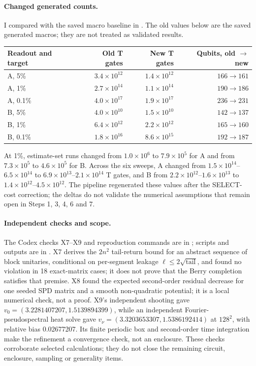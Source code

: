 \documentclass[11pt,a4paper]{article}
\begin{document}
\paragraph{Changed generated counts.}
I compared  with the saved macro baseline in
. The old values below are the saved generated macros; they are not treated as validated results.
\begin{center}\small
\begin{tabular}{@{}lrrr@{}}
\toprule
Readout and target & Old T gates & New T gates & Qubits, old $\to$ new\\
\midrule
A, 5\% & $3.4\times10^{12}$ & $1.4\times10^{12}$ & $166\to161$\\
A, 1\% & $2.7\times10^{14}$ & $1.1\times10^{14}$ & $190\to186$\\
A, 0.1\% & $4.0\times10^{17}$ & $1.9\times10^{17}$ & $236\to231$\\
B, 5\% & $4.0\times10^{10}$ & $1.5\times10^{10}$ & $142\to137$\\
B, 1\% & $6.4\times10^{12}$ & $2.2\times10^{12}$ & $165\to160$\\
B, 0.1\% & $1.8\times10^{16}$ & $8.6\times10^{15}$ & $192\to187$\\
\bottomrule
\end{tabular}
\end{center}
At 1\%, estimate-set runs changed from $1.0\times10^6$ to $7.9\times10^5$ for A and from $7.3\times10^5$ to
$4.6\times10^5$ for B. Across the six sweeps, A changed from $1.5\times10^{14}$--$6.5\times10^{14}$ to
$6.9\times10^{13}$--$2.1\times10^{14}$ T gates, and B from $2.2\times10^{12}$--$1.6\times10^{13}$ to
$1.4\times10^{12}$--$4.5\times10^{12}$. The pipeline regenerated these values after the SELECT-cost correction;
the deltas do not validate the numerical assumptions that remain open in Steps 1, 3, 4, 6 and 7.

\paragraph{Independent checks and scope.}
The Codex checks X7--X9 and reproduction commands are in ; scripts and outputs are in
. X7 derives the $2n^2$ tail-return bound for an abstract sequence of block unitaries, conditional on
per-segment leakage $\ell\le2\sqrt{\text{tail}}$, and found no violation in 18 exact-matrix cases; it does not prove that the
Berry completion satisfies that premise. X8 found the expected second-order residual decrease for one seeded SPD matrix and a
smooth non-quadratic potential; it is a local numerical check, not a proof. X9's independent shooting gave
$v_0=(3.2281407207,1.5139894399)$, while an independent Fourier-pseudospectral heat solve gave
$v_\nu=(3.3203653307,1.5386192414)$ at $128^2$, with relative bias 0.02677207. Its finite periodic box and second-order
time integration make the refinement a convergence check, not an enclosure. These checks corroborate selected calculations;
they do not close the remaining circuit, enclosure, sampling or generality items.
\end{document}

